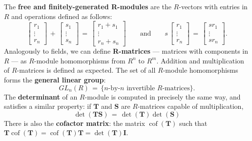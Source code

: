 \documentclass[11pt]{article}
\newcommand{\mat}[1]{\mathbf{#1}}
\newcommand{\cof}{\operatorname{cof}}
\begin{document}
The \textbf{free and finitely-generated R-modules} are the $R$-vectors with entries in $R$ and operations defined as follows:
\[
  \begin{bmatrix} r_{1} \\ \vdots \\ r_{n} \end{bmatrix} \, + \, \begin{bmatrix} s_{1} \\ \vdots \\ s_{n} \end{bmatrix} \, = \, \begin{bmatrix} r_{1} + s_{1} \\ \vdots \\ r_{n} + s_{n} \end{bmatrix} \qquad \text{and} \qquad s \, \begin{bmatrix} r_{1} \\ \vdots \\ r_{n} \end{bmatrix} \, = \, \begin{bmatrix} s r_{1} \\ \vdots \\ s r_{n} \end{bmatrix}.
\]
Analogously to fields, we can define \textbf{R-matrices} --- matrices with components in $R$ --- as $R$-module homomorphisms from $R^{n}$ to $R^{m}$. Addition and multiplication of $R$-matrices is defined as expected. The set of all $R$-module homomorphisms forms the \textbf{general linear group}:
\[
  GL_{n}(R) \, = \, \{ \text{$n$-by-$n$ invertible $R$-matrices} \}.
\]
The \textbf{determinant} of an $R$-module is computed in precisely the same way, and satisfies a similar property: if $\mat{T}$ and $\mat{S}$ are $R$-matrices capable of multiplication,
\[
  \det(\mat{TS}) \, = \, \det(\mat{T}) \det(\mat{S})
\]
There is also the \textbf{cofactor matrix}: the matrix $\cof(\mat{T})$ such that $\mat{T} \cof(\mat{T}) = \cof(\mat{T}) \mat{T} = \det(\mat{T}) \mat{I}$.

\newpage
\end{document}
